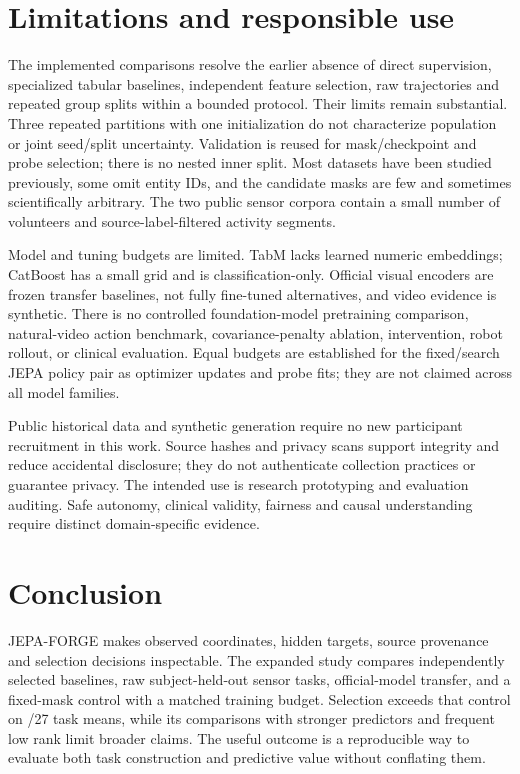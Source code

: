 \documentclass{article}
\newcommand{\jepa}{JEPA-FORGE}
\begin{document}
\section{Limitations and responsible use}
The implemented comparisons resolve the earlier absence of direct supervision, specialized tabular baselines, independent feature selection, raw trajectories and repeated group splits within a bounded protocol. Their limits remain substantial. Three repeated partitions with one initialization do not characterize population or joint seed/split uncertainty. Validation is reused for mask/checkpoint and probe selection; there is no nested inner split. Most datasets have been studied previously, some omit entity IDs, and the candidate masks are few and sometimes scientifically arbitrary. The two public sensor corpora contain a small number of volunteers and source-label-filtered activity segments.

Model and tuning budgets are limited. TabM lacks learned numeric embeddings; CatBoost has a small grid and is classification-only. Official visual encoders are frozen transfer baselines, not fully fine-tuned alternatives, and video evidence is synthetic. There is no controlled foundation-model pretraining comparison, natural-video action benchmark, covariance-penalty ablation, intervention, robot rollout, or clinical evaluation. Equal budgets are established for the fixed/search JEPA policy pair as optimizer updates and probe fits; they are not claimed across all model families.

Public historical data and synthetic generation require no new participant recruitment in this work. Source hashes and privacy scans support integrity and reduce accidental disclosure; they do not authenticate collection practices or guarantee privacy. The intended use is research prototyping and evaluation auditing. Safe autonomy, clinical validity, fairness and causal understanding require distinct domain-specific evidence.

\section{Conclusion}
\jepa{} makes observed coordinates, hidden targets, source provenance and selection decisions inspectable. The expanded study compares independently selected baselines, raw subject-held-out sensor tasks, official-model transfer, and a fixed-mask control with a matched training budget. Selection exceeds that control on \ExtPolicyWins/27 task means, while its comparisons with stronger predictors and frequent low rank limit broader claims. The useful outcome is a reproducible way to evaluate both task construction and predictive value without conflating them.
\end{document}
